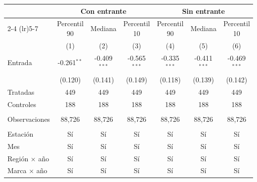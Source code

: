 
\begingroup
\centering
\begin{tabular}{lcccccc}
   \toprule
    & \multicolumn{3}{c}{Con entrante} & \multicolumn{3}{c}{Sin entrante} \\ \cmidrule(lr){2-4} \cmidrule(lr){5-7}
                        & Percentil 90  & Mediana        & Percentil 10   & Percentil 90   & Mediana        & Percentil 10 \\   
                        & (1)           & (2)            & (3)            & (4)            & (5)            & (6)\\  
   \midrule 
   Entrada              & -0.261$^{**}$ & -0.409$^{***}$ & -0.565$^{***}$ & -0.335$^{***}$ & -0.411$^{***}$ & -0.469$^{***}$\\   
                        & (0.120)       & (0.141)        & (0.149)        & (0.118)        & (0.139)        & (0.142)\\   
   Tratadas             & 449           & 449            & 449            & 449            & 449            & 449\\  
   Controles            & 188           & 188            & 188            & 188            & 188            & 188\\  
    \\
   Observaciones        & 88,726        & 88,726         & 88,726         & 88,726         & 88,726         & 88,726\\  
    \\
   Estación             & Sí            & Sí             & Sí             & Sí             & Sí             & Sí\\  
   Mes                  & Sí            & Sí             & Sí             & Sí             & Sí             & Sí\\  
   Región $\times$ año  & Sí            & Sí             & Sí             & Sí             & Sí             & Sí\\  
   Marca $\times$ año   & Sí            & Sí             & Sí             & Sí             & Sí             & Sí\\  
   \bottomrule
\end{tabular}
\par\endgroup


